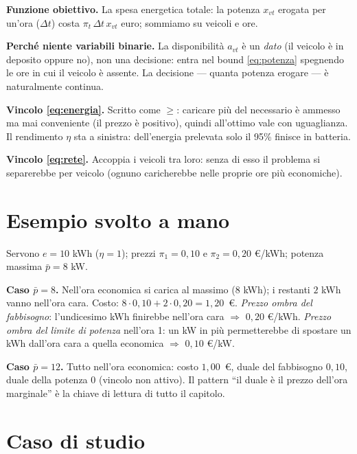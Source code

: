 \begin{spiegazione}
\textbf{Funzione obiettivo.} La spesa energetica totale: la potenza $x_{vt}$ erogata
per un'ora ($\Delta t$) costa $\pi_t\, \Delta t\, x_{vt}$ euro; sommiamo su veicoli
e ore.

\textbf{Perché niente variabili binarie.} La disponibilità $a_{vt}$ è un \emph{dato}
(il veicolo è in deposito oppure no), non una decisione: entra nel bound
\eqref{eq:potenza} spegnendo le ore in cui il veicolo è assente. La decisione ---
quanta potenza erogare --- è naturalmente continua.

\textbf{Vincolo \eqref{eq:energia}.} Scritto come $\ge$: caricare più del necessario è
ammesso ma mai conveniente (il prezzo è positivo), quindi all'ottimo vale con
uguaglianza. Il rendimento $\eta$ sta a sinistra: dell'energia prelevata solo il 95\%
finisce in batteria.

\textbf{Vincolo \eqref{eq:rete}.} Accoppia i veicoli tra loro: senza di esso il
problema si separerebbe per veicolo (ognuno caricherebbe nelle proprie ore più
economiche).
\end{spiegazione}

\section{Esempio svolto a mano}

\begin{esempio}
Servono $e = 10$ kWh ($\eta = 1$); prezzi $\pi_1 = 0{,}10$ e $\pi_2 = 0{,}20$
\euro/kWh; potenza massima $\bar p = 8$ kW.

\textbf{Caso $\bar p = 8$.} Nell'ora economica si carica al massimo ($8$ kWh); i restanti
$2$ kWh vanno nell'ora cara. Costo: $8 \cdot 0{,}10 + 2 \cdot 0{,}20 = 1{,}20$~\euro.
\emph{Prezzo ombra del fabbisogno}: l'undicesimo kWh finirebbe nell'ora cara
$\Rightarrow$ $0{,}20$ \euro/kWh. \emph{Prezzo ombra del limite di potenza} nell'ora
1: un kW in più permetterebbe di spostare un kWh dall'ora cara a quella economica
$\Rightarrow$ $0{,}10$ \euro/kW.

\textbf{Caso $\bar p = 12$.} Tutto nell'ora economica: costo $1{,}00$~\euro, duale del
fabbisogno $0{,}10$, duale della potenza $0$ (vincolo non attivo). Il pattern
``il duale è il prezzo dell'ora marginale'' è la chiave di lettura di tutto il
capitolo.
\end{esempio}

\section{Caso di studio}

